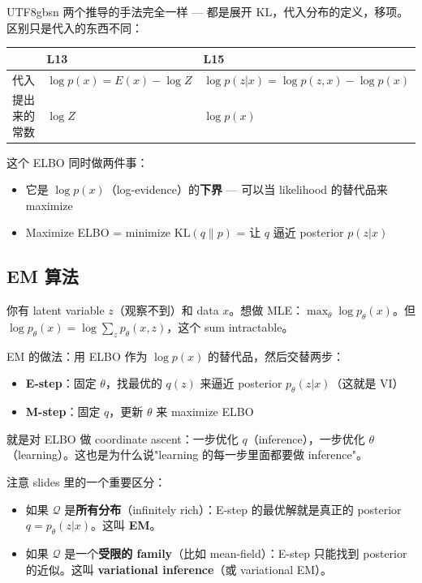 \documentclass[11pt]{article}
\begin{document}
\begin{CJK}{UTF8}{gbsn}
两个推导的手法完全一样 --- 都是展开 KL，代入分布的定义，移项。区别只是代入的东西不同：

\begin{center}
\begin{tabular}{l|l|l}
  & L13 & L15 \\
  \hline
  代入 & $\log p(x) = E(x) - \log Z$ & $\log p(z|x) = \log p(z,x) - \log p(x)$ \\
  提出来的常数 & $\log Z$ & $\log p(x)$ \\
\end{tabular}
\end{center}

这个 ELBO 同时做两件事：
\begin{itemize}
  \item 它是 $\log p(x)$（log-evidence）的\textbf{下界} --- 可以当 likelihood 的替代品来 maximize
  \item Maximize ELBO = minimize $\mathrm{KL}(q \| p)$ = 让 $q$ 逼近 posterior $p(z|x)$
\end{itemize}

\subsection{EM 算法}

你有 latent variable $z$（观察不到）和 data $x$。想做 MLE：$\max_\theta \log p_\theta(x)$。但 $\log p_\theta(x) = \log \sum_z p_\theta(x,z)$，这个 sum intractable。

EM 的做法：用 ELBO 作为 $\log p(x)$ 的替代品，然后交替两步：
\begin{itemize}
  \item \textbf{E-step}：固定 $\theta$，找最优的 $q(z)$ 来逼近 posterior $p_\theta(z|x)$（这就是 VI）
  \item \textbf{M-step}：固定 $q$，更新 $\theta$ 来 maximize ELBO
\end{itemize}

就是对 ELBO 做 coordinate ascent：一步优化 $q$（inference），一步优化 $\theta$（learning）。这也是为什么说"learning 的每一步里面都要做 inference"。

注意 slides 里的一个重要区分：
\begin{itemize}
  \item 如果 $\mathcal{Q}$ 是\textbf{所有分布}（infinitely rich）：E-step 的最优解就是真正的 posterior $q = p_\theta(z|x)$。这叫 \textbf{EM}。
  \item 如果 $\mathcal{Q}$ 是一个\textbf{受限的 family}（比如 mean-field）：E-step 只能找到 posterior 的近似。这叫 \textbf{variational inference}（或 variational EM）。
\end{itemize}


\end{CJK}
\end{document}
